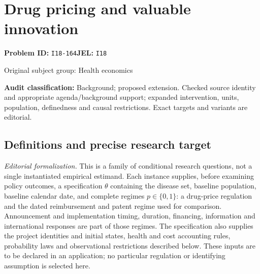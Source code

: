 \documentclass[11pt,a4paper]{article}
\begin{document}
\section*{Drug pricing and valuable innovation}
\textbf{Problem ID:} \texttt{I18-164}\quad \textbf{JEL:} \texttt{I18}\par
\label{problem:OP-0445}
{\sffamily\small\color{muted}Original subject group: Health economics\par}
\label{definitions:problem:30007727}
\textbf{Audit classification:} Background; proposed extension. Checked source identity and appropriate agenda/background support; expanded intervention, units, population, definedness and causal restrictions. Exact targets and variants are editorial.
\subsection*{Definitions and precise research target}
\textit{Editorial formalization.} This is a family of conditional research questions, not a single instantiated empirical estimand. Each instance supplies, before examining policy outcomes, a specification \(\theta\) containing the disease set, baseline population, baseline calendar date, and complete regimes \(p\in\{0,1\}\): a drug-price regulation and the dated reimbursement and patent regime used for comparison. Announcement and implementation timing, duration, financing, information and international responses are part of those regimes. The specification also supplies the project identities and initial states, health and cost accounting rules, probability laws and observational restrictions described below. These inputs are to be declared in an application; no particular regulation or identifying assumption is selected here.
\end{document}
